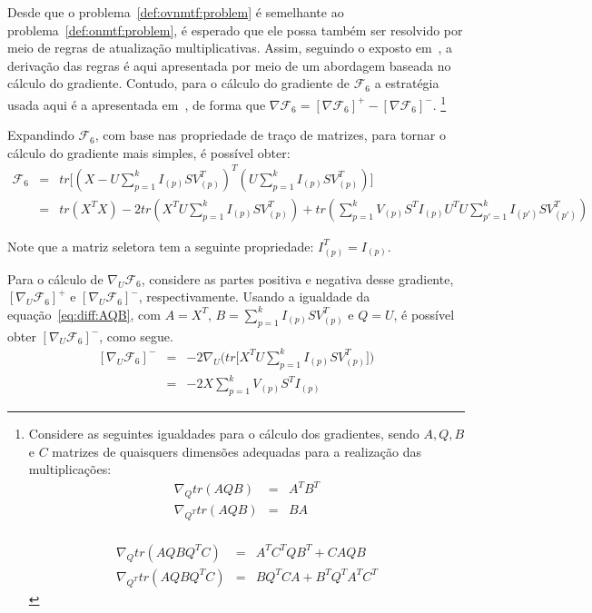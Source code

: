\documentclass[
    12pt,                %
    oneside,            %
    a4paper,            %
    english,            %
    brazil                %
    ]{abntex2ppgsi}
\newcommand\blfootnote[1]{%
  \begingroup
  \renewcommand\thefootnote{}\footnote{#1}%
  \addtocounter{footnote}{-1}%
  \endgroup
}
\begin{document}
Desde que o problema~\ref{def:ovnmtf:problem} é semelhante ao problema~\ref{def:onmtf:problem}, é esperado que ele possa também ser resolvido por meio de regras de atualização multiplicativas.
Assim, seguindo o exposto em~\cite{Yoo2010}, a derivação das regras é aqui apresentada por meio de um abordagem baseada no cálculo do gradiente.
Contudo, para o cálculo do gradiente de $\mathcal{F}_6$ a estratégia usada aqui é a apresentada em~, de forma que $\nabla \mathcal{F}_6 = [\nabla \mathcal{F}_6]^+ - [\nabla \mathcal{F}_6]^-$.\blfootnote{Considere as seguintes igualdades para o cálculo dos gradientes, sendo $A, Q, B$ e $C$ matrizes de quaisquers dimensões adequadas para a realização das multiplicações:
\begin{equation}
\label{eq:diff:AQB}
\begin{array}{lcl}
\nabla_Q tr( AQB )     & = & A^T B^T \\
\nabla_{Q^T} tr( AQB ) & = & BA \\
\end{array}
\end{equation}

\begin{equation}
\label{eq:diff:AQBQtC}
\begin{array}{lcl}
\nabla_Q tr( AQBQ^TC )     & = & A^TC^TQB^T + CAQB \\
\nabla_{Q^T} tr( AQBQ^TC ) & = & BQ^TCA + B^TQ^TA^TC^T
\end{array}
\end{equation}
}

Expandindo $\mathcal{F}_6$, com base nas propriedade de traço de matrizes, para tornar o cálculo do gradiente mais simples, é possível obter:
\[
    \begin{array}{lcl}
        \displaystyle \mathcal{F}_6 & = & tr\big[ (X - U\sum_{p=1}^{k}I_{(p)}SV_{(p)}^T)^T (U\sum_{p=1}^{k}I_{(p)}SV_{(p)}^T) \big] \\
                                    & = & tr(X^TX) - 2 tr( X^T U \sum_{p=1}^{k} I_{(p)} S V_{(p)}^T ) + tr( \sum_{p=1}^{k} V_{(p)} S^T I_{(p)} U^T U \sum_{p'=1}^k I_{(p')} S V_{(p')}^T )
    \end{array}
\]

Note que a matriz seletora tem a seguinte propriedade: $I_{(p)}^T = I_{(p)}$.

Para o cálculo de $\nabla_U \mathcal{F}_6$, considere as partes positiva e negativa desse gradiente, $[\nabla_U \mathcal{F}_6]^+$ e $[\nabla_U \mathcal{F}_6]^-$, respectivamente.
Usando a igualdade da equação~\ref{eq:diff:AQB}, com $A = X^T$, $B = \sum_{p=1}^{k}I_{(p)}SV_{(p)}^T$ e $Q = U$, é possível obter $[\nabla_U \mathcal{F}_6]^-$, como segue.
\[
    \begin{array}{lcl}
        [\nabla_U \mathcal{F}_6]^- & = & - 2 \nabla_U \Big( tr\big[ X^T U \sum_{p=1}^{k}I_{(p)}SV_{(p)}^T \big] \Big) \\
                                   & = & - 2 X \sum_{p=1}^{k} V_{(p)} S^T I_{(p)}
    \end{array}
\]
\end{document}
